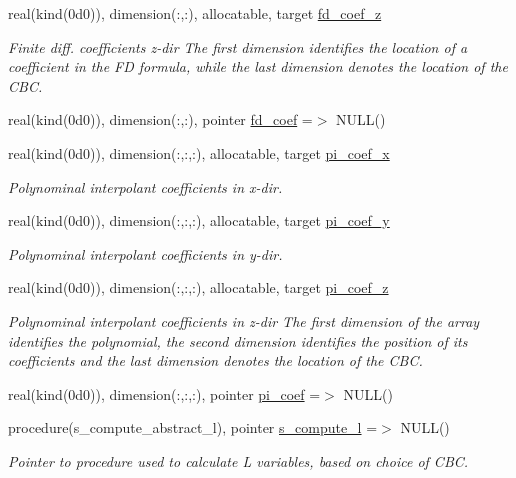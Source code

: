 \begin{DoxyCompactItemize}
real(kind(0d0)), dimension(\+:,\+:), allocatable, target \hyperlink{namespacem__cbc_a025a2f672d7d9997966bdedab3f333de}{fd\+\_\+coef\+\_\+z}
\begin{DoxyCompactList}\small\item\em Finite diff. coefficients z-\/dir The first dimension identifies the location of a coefficient in the FD formula, while the last dimension denotes the location of the C\+BC. \end{DoxyCompactList}\item 
real(kind(0d0)), dimension(\+:,\+:), pointer \hyperlink{namespacem__cbc_a5950f5d9fbc613591a42a3f9587f32f5}{fd\+\_\+coef} =$>$ N\+U\+LL()
\item 
real(kind(0d0)), dimension(\+:,\+:,\+:), allocatable, target \hyperlink{namespacem__cbc_a906043af9a1ee38feda508ccb40c5402}{pi\+\_\+coef\+\_\+x}
\begin{DoxyCompactList}\small\item\em Polynominal interpolant coefficients in x-\/dir. \end{DoxyCompactList}\item 
real(kind(0d0)), dimension(\+:,\+:,\+:), allocatable, target \hyperlink{namespacem__cbc_a54a6e22ead2511305b7370369f46af7a}{pi\+\_\+coef\+\_\+y}
\begin{DoxyCompactList}\small\item\em Polynominal interpolant coefficients in y-\/dir. \end{DoxyCompactList}\item 
real(kind(0d0)), dimension(\+:,\+:,\+:), allocatable, target \hyperlink{namespacem__cbc_af820095dcf800b727c19f2b5ee95a814}{pi\+\_\+coef\+\_\+z}
\begin{DoxyCompactList}\small\item\em Polynominal interpolant coefficients in z-\/dir The first dimension of the array identifies the polynomial, the second dimension identifies the position of its coefficients and the last dimension denotes the location of the C\+BC. \end{DoxyCompactList}\item 
real(kind(0d0)), dimension(\+:,\+:,\+:), pointer \hyperlink{namespacem__cbc_ace0392bdc9bb94c00e11d4e51432e0ad}{pi\+\_\+coef} =$>$ N\+U\+LL()
\item 
procedure(s\+\_\+compute\+\_\+abstract\+\_\+l), pointer \hyperlink{namespacem__cbc_a6ba3d055b8d3c0d003ff74ccd2762b1c}{s\+\_\+compute\+\_\+l} =$>$ N\+U\+LL()
\begin{DoxyCompactList}\small\item\em Pointer to procedure used to calculate L variables, based on choice of C\+BC. \end{DoxyCompactList}\item 

\end{DoxyCompactItemize}
